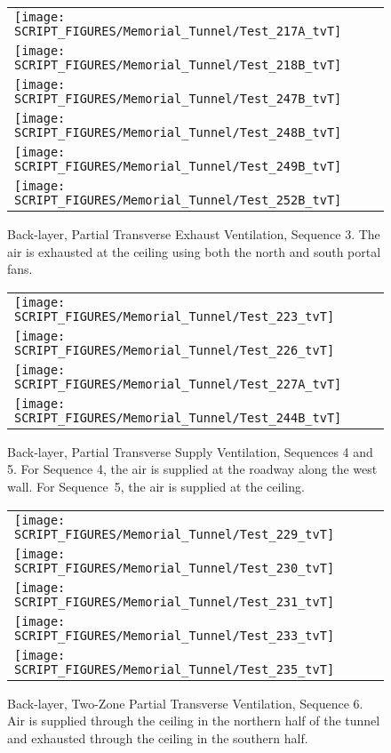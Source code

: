 \begin{figure}[p]
\begin{tabular*}{\textwidth}{l}
\texttt{[image: SCRIPT\_FIGURES/Memorial\_Tunnel/Test\_217A\_tvT]} \\
\texttt{[image: SCRIPT\_FIGURES/Memorial\_Tunnel/Test\_218B\_tvT]} \\
\texttt{[image: SCRIPT\_FIGURES/Memorial\_Tunnel/Test\_247B\_tvT]} \\
\texttt{[image: SCRIPT\_FIGURES/Memorial\_Tunnel/Test\_248B\_tvT]} \\
\texttt{[image: SCRIPT\_FIGURES/Memorial\_Tunnel/Test\_249B\_tvT]} \\
\texttt{[image: SCRIPT\_FIGURES/Memorial\_Tunnel/Test\_252B\_tvT]}
\end{tabular*}
\caption[Back-layer, Partial Transverse Exhaust Ventilation, Sequence 3]{Back-layer, Partial Transverse Exhaust Ventilation, Sequence 3. The air is exhausted at the ceiling using both the north and south portal fans.}
\label{Memorial_Tunnel_Seq_3c}
\end{figure}

\begin{figure}[p]
\begin{tabular*}{\textwidth}{l}
\texttt{[image: SCRIPT\_FIGURES/Memorial\_Tunnel/Test\_223\_tvT]} \\
\texttt{[image: SCRIPT\_FIGURES/Memorial\_Tunnel/Test\_226\_tvT]} \\
\texttt{[image: SCRIPT\_FIGURES/Memorial\_Tunnel/Test\_227A\_tvT]} \\
\texttt{[image: SCRIPT\_FIGURES/Memorial\_Tunnel/Test\_244B\_tvT]}
\end{tabular*}
\caption[Back-layer, Partial Transverse Supply Ventilation, Sequences 4 and 5]{Back-layer, Partial Transverse Supply Ventilation, Sequences 4 and 5. For Sequence 4, the air is supplied at the roadway along the west wall. For Sequence~5, the air is supplied at the ceiling.}
\label{Memorial_Tunnel_Seq_4_and_5}
\end{figure}

\begin{figure}[p]
\begin{tabular*}{\textwidth}{l}
\texttt{[image: SCRIPT\_FIGURES/Memorial\_Tunnel/Test\_229\_tvT]} \\
\texttt{[image: SCRIPT\_FIGURES/Memorial\_Tunnel/Test\_230\_tvT]} \\
\texttt{[image: SCRIPT\_FIGURES/Memorial\_Tunnel/Test\_231\_tvT]} \\
\texttt{[image: SCRIPT\_FIGURES/Memorial\_Tunnel/Test\_233\_tvT]} \\
\texttt{[image: SCRIPT\_FIGURES/Memorial\_Tunnel/Test\_235\_tvT]}
\end{tabular*}
\caption[Back-layer, Two-Zone Partial Transverse Ventilation, Sequence 6]{Back-layer, Two-Zone Partial Transverse Ventilation, Sequence 6. Air is supplied through the ceiling in the northern half of the tunnel and exhausted through the ceiling in the southern half.}
\label{Memorial_Tunnel_Seq_6a}
\end{figure}

